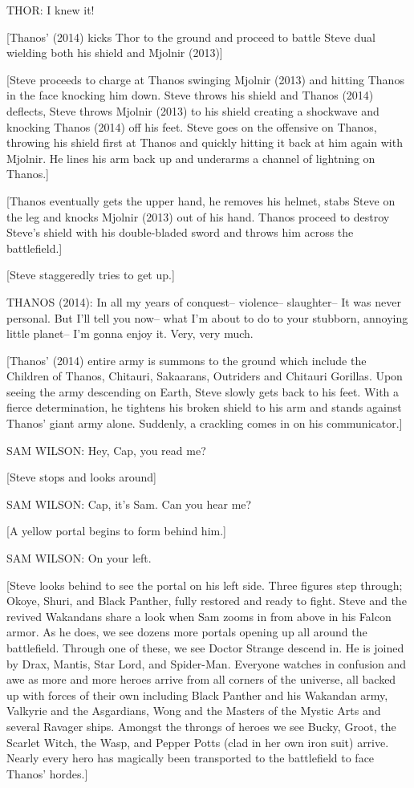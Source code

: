 THOR: I knew it!

[Thanos' (2014) kicks Thor to the ground and proceed to battle Steve dual wielding both his shield and Mjolnir (2013)]

[Steve proceeds to charge at Thanos swinging Mjolnir (2013) and hitting Thanos in the face knocking him down. Steve throws his shield and Thanos (2014) deflects, Steve throws Mjolnir (2013) to his shield creating a shockwave and knocking Thanos (2014) off his feet. Steve goes on the offensive on Thanos, throwing his shield first at Thanos and quickly hitting it back at him again with Mjolnir. He lines his arm back up and underarms a channel of lightning on Thanos.]

[Thanos eventually gets the upper hand, he removes his helmet, stabs Steve on the leg and knocks Mjolnir (2013) out of his hand. Thanos proceed to destroy Steve's shield with his double-bladed sword and throws him across the battlefield.]

[Steve staggeredly tries to get up.]

THANOS (2014): In all my years of conquest– violence– slaughter– It was never personal. But I'll tell you now– what I'm about to do to your stubborn, annoying little planet– I'm gonna enjoy it. Very, very much.

[Thanos' (2014) entire army is summons to the ground which include the Children of Thanos, Chitauri, Sakaarans, Outriders and Chitauri Gorillas. Upon seeing the army descending on Earth, Steve slowly gets back to his feet. With a fierce determination, he tightens his broken shield to his arm and stands against Thanos' giant army alone. Suddenly, a crackling comes in on his communicator.]

SAM WILSON: Hey, Cap, you read me?

[Steve stops and looks around]

SAM WILSON: Cap, it's Sam. Can you hear me?

[A yellow portal begins to form behind him.]

SAM WILSON: On your left.

[Steve looks behind to see the portal on his left side. Three figures step through; Okoye, Shuri, and Black Panther, fully restored and ready to fight. Steve and the revived Wakandans share a look when Sam zooms in from above in his Falcon armor. As he does, we see dozens more portals opening up all around the battlefield. Through one of these, we see Doctor Strange descend in. He is joined by Drax, Mantis, Star Lord, and Spider-Man. Everyone watches in confusion and awe as more and more heroes arrive from all corners of the universe, all backed up with forces of their own including Black Panther and his Wakandan army, Valkyrie and the Asgardians, Wong and the Masters of the Mystic Arts and several Ravager ships. Amongst the throngs of heroes we see Bucky, Groot, the Scarlet Witch, the Wasp, and Pepper Potts (clad in her own iron suit) arrive. Nearly every hero has magically been transported to the battlefield to face Thanos' hordes.]

